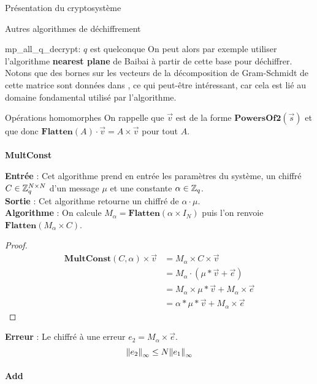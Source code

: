 \begin{section}{Présentation du cryptosystème}
\begin{subsection}{Autres algorithmes de déchiffrement}
\begin{subsubsection}{mp\_all\_q\_decrypt: $q$ est quelconque}
On peut alors par exemple utiliser l'algorithme \textbf{nearest plane} de Baibai à partir de cette base pour déchiffrer. Notons que des bornes sur les vecteurs de la décomposition de Gram-Schmidt de cette matrice sont données dans \cite{EC:MicPei12}, ce qui peut-être intéressant, car cela est lié au domaine fondamental utilisé par l'algorithme.

\end{subsubsection}	
\end{subsection}

\begin{subsection}{Opérations homomorphes}
	On rappelle que $\vec{v}$ est de la forme $\textbf{PowersOf2}(\vec{s})$ et que donc $\textbf{Flatten}(A) \cdot \vec{v} = A \times \vec{v}$ pour tout $A$.
	
	\paragraph{}
	\textbf{MultConst}
	\flushleft
	
	\textbf{Entrée} : Cet algorithme prend en entrée les paramètres du système, un chiffré $C \in \mathbb{Z}_q^{N \times N}$ d'un message $\mu$ et une constante $\alpha \in \mathbb{Z}_q$. \\
	\textbf{Sortie} : Cet algorithme retourne un chiffré de $\alpha \cdot \mu$.\\
	\textbf{Algorithme} : On calcule $M_{\alpha} = \textbf{Flatten}(\alpha \times I_N)$ puis l'on renvoie $\textbf{Flatten}(M_{\alpha} \times C)$.
	\begin{proof}
	\begin{align*}
	\textbf{MultConst}(C, \alpha) \times \vec{v} &= M_{\alpha} \times C \times \vec{v} \\
	&= M_{\alpha} \cdot (\mu * \vec{v} + \vec{e}) \\
	&= M_{\alpha} \times \mu * \vec{v} + M_{\alpha} \times \vec{e} \\
	&= \alpha * \mu * \vec{v} + M_{\alpha} \times \vec{e}
	\end{align*}
	\end{proof}
	\textbf{Erreur} : Le chiffré à une erreur $e_2 = M_\alpha \times
		\vec{e}$. 
		\[{\|e_2\|}_{\infty} \leq N {\|e_1\|}_{\infty}\]
	\paragraph{}
	\textbf{Add}
	\flushleft
	

\end{subsection}
\end{section}
